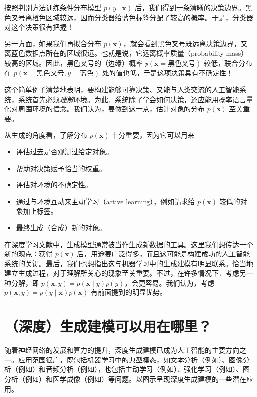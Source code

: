 按照判别方法训练条件分布模型 $p(y\mid\mathbf{x})$ 后，我们得到一条清晰的决策边界。黑色叉号离橙色区域较远，因而分类器给蓝色标签分配了较高的概率。于是，分类器对这个决策很有把握！

另一方面，如果我们再拟合分布 $p(\mathbf{x})$，就会看到黑色叉号既远离决策边界，又离蓝色数据点所在的区域很远。也就是说，它远离概率质量（probability mass）较高的区域。因此，黑色叉号的（边缘）概率 $p(\mathbf{x}=\text{黑色叉号})$ 较低，联合分布在 $p(\mathbf{x}=\text{黑色叉号},y=\text{蓝色})$ 处的值也低，于是这项决策具有不确定性！

这个简单例子清楚地表明，要构建能够可靠决策、又能与人类交流的人工智能系统，系统首先必须\emph{理解}环境。为此，系统除了学会如何决策，还应能用概率语言量化对周围环境的信念。我们认为，要做到这一点，估计对象的分布 $p(\mathbf{x})$ 至关重要。

从生成的角度看，了解分布 $p(\mathbf{x})$ 十分重要，因为它可以用来
\begin{itemize}
\item 评估过去是否观测过给定对象。
\item 帮助对决策赋予恰当的权重。
\item 评估对环境的不确定性。
\item 通过与环境互动来主动学习（active learning），例如请求给 $p(\mathbf{x})$ 较低的对象加上标签。
\item 最终生成（合成）新的对象。
\end{itemize}

在深度学习文献中，生成模型通常被当作生成新数据的工具。这里我们想传达一个新的观点：获得 $p(\mathbf{x})$ 后，用途要广泛得多，而且这可能是构建成功的人工智能系统的关键。最后，我们也想指出这与机器学习中的生成建模有明显联系。恰当地建立生成过程，对于理解所关心的现象至关重要。不过，在许多情况下，考虑另一种分解，即 $p(\mathbf{x},y)=p(\mathbf{x}\mid y)p(y)$，会更容易。我们认为，考虑 $p(\mathbf{x},y)=p(y\mid\mathbf{x})p(\mathbf{x})$ 有前面提到的明显优势。

\section{（深度）生成建模可以用在哪里？}
\label{sec:uses}
随着神经网络的发展和算力的提升，深度生成建模已成为人工智能的主要方向之一。应用范围很广，既包括机器学习中的典型模态，如文本分析（例如）、图像分析（例如）和音频分析（例如），也包括主动学习（例如）、强化学习（例如）、图分析（例如）和医学成像（例如）等问题。以图示呈现深度生成建模的一些潜在应用。

